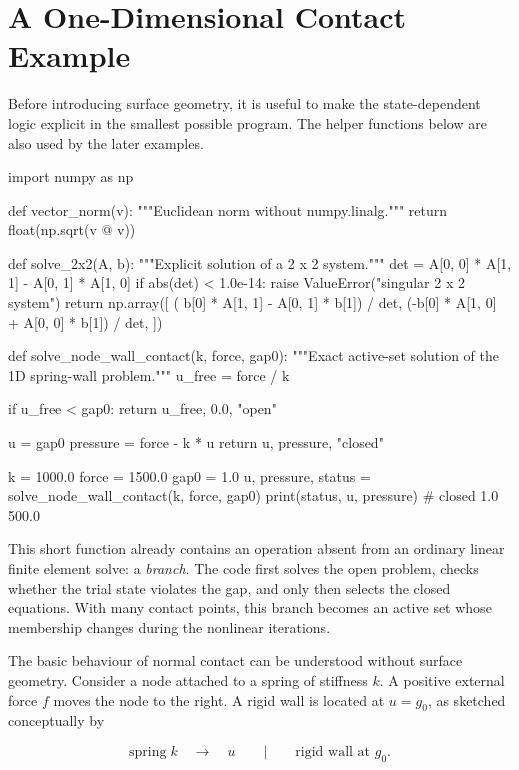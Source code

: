 \section{A One-Dimensional Contact Example}

Before introducing surface geometry, it is useful to make the state-dependent
logic explicit in the smallest possible program. The helper functions below are
also used by the later examples.

\begin{python}
import numpy as np


def vector_norm(v):
    """Euclidean norm without numpy.linalg."""
    return float(np.sqrt(v @ v))


def solve_2x2(A, b):
    """Explicit solution of a 2 x 2 system."""
    det = A[0, 0] * A[1, 1] - A[0, 1] * A[1, 0]
    if abs(det) < 1.0e-14:
        raise ValueError("singular 2 x 2 system")
    return np.array([
        ( b[0] * A[1, 1] - A[0, 1] * b[1]) / det,
        (-b[0] * A[1, 0] + A[0, 0] * b[1]) / det,
    ])


def solve_node_wall_contact(k, force, gap0):
    """Exact active-set solution of the 1D spring-wall problem."""
    u_free = force / k

    if u_free < gap0:
        return u_free, 0.0, "open"

    u = gap0
    pressure = force - k * u
    return u, pressure, "closed"


k = 1000.0
force = 1500.0
gap0 = 1.0
u, pressure, status = solve_node_wall_contact(k, force, gap0)
print(status, u, pressure)
# closed 1.0 500.0
\end{python}

This short function already contains an operation absent from an ordinary
linear finite element solve: a \textit{branch}. The code first solves the open
problem, checks whether the trial state violates the gap, and only then selects
the closed equations. With many contact points, this branch becomes an active
set whose membership changes during the nonlinear iterations.

The basic behaviour of normal contact can be understood without surface
geometry. Consider a node attached to a spring of stiffness $ k $. A positive
external force $ f $ moves the node to the right. A rigid wall is located at
$ u = g_0 $, as sketched conceptually by

\begin{equation}
    \text{spring} \; k \quad \longrightarrow \quad u
    \qquad \vert \qquad \text{rigid wall at } g_0.
\end{equation}

